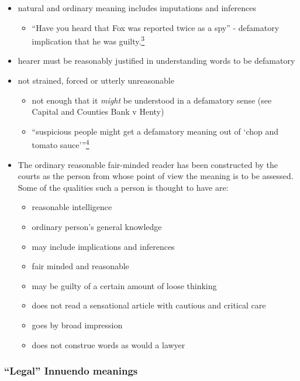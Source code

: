 \documentclass[]{article}
\begin{document}
\begin{itemize}
\item
  natural and ordinary meaning includes imputations and inferences

  \begin{itemize}
  \item
    ``{Have you heard that Fox was reported twice as a spy'' -
    defamatory implication that he was
    guilty.\hyperref[sdfootnote3sym]{\textsuperscript{3}}}
  \end{itemize}
\item
  hearer must be reasonably justified in understanding words to be
  defamatory
\item
  not strained, forced or utterly unreasonable

  \begin{itemize}
  \item
    {not enough that it }\emph{{might}}{{ be understood in a defamatory
    sense (see Capital and Counties Bank v Henty)}}
  \item
    ``{{suspicious people might get a defamatory meaning out of `chop
    and tomato sauce'''\hyperref[sdfootnote4sym]{\textsuperscript{4}}}}
  \end{itemize}
\item
  The ordinary reasonable fair-minded reader has been constructed by the
  courts as the person from whose point of view the meaning is to be
  assessed. Some of the qualities such a person is thought to have are:

  \begin{itemize}
  \item
    reasonable intelligence
  \item
    ordinary person's general knowledge
  \item
    may include implications and inferences
  \item
    fair minded and reasonable
  \item
    may be guilty of a certain amount of loose thinking
  \item
    does not read a sensational article with cautious and critical care
  \item
    goes by broad impression
  \item
    does not construe words as would a lawyer
  \end{itemize}
\end{itemize}

\subsubsection{\texorpdfstring{``Legal'' Innuendo
meanings}{Legal Innuendo meanings}}
\end{document}
